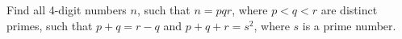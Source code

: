 Find all 4-digit numbers $n$, such that $n=pqr$, where $p<q<r$ are distinct primes, such that $p+q=r-q$ and $p+q+r=s^2$, where $s$ is a prime number.